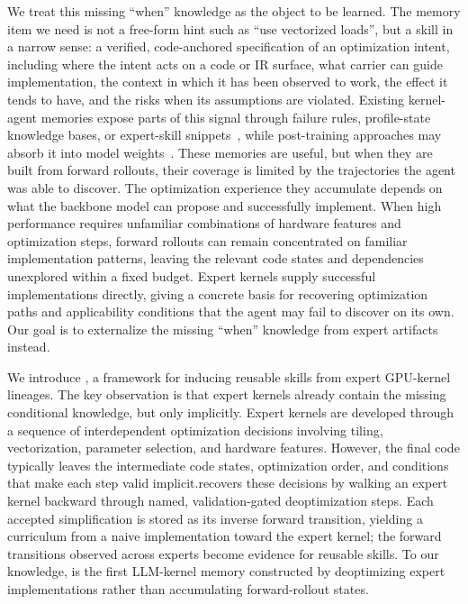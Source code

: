 We treat this missing ``when'' knowledge as the object to be learned. The memory item we need is not a free-form hint such as ``use vectorized loads'', but a skill in a narrow sense: a verified, code-anchored specification of an optimization intent, including where the intent acts on a code or IR surface, what carrier can guide implementation, the context in which it has been observed to work, the effect it tends to have, and the risks when its assumptions are violated. Existing kernel-agent memories expose parts of this signal through failure rules, profile-state knowledge bases, or expert-skill snippets~\citep{adaexplore,ksearch,kernelblaster,kernel_skill}, while post-training approaches may absorb it into model weights~\citep{kernel_smith,kevin_rl_kernel,cuda_l1}. 
These memories are useful, but when they are built from forward rollouts, their coverage is limited by the trajectories the agent was able to discover. The optimization experience they accumulate depends on what the backbone model can propose and successfully implement. When high performance requires unfamiliar combinations of hardware features and optimization steps, forward rollouts can remain concentrated on familiar implementation patterns, leaving the relevant code states and dependencies unexplored within a fixed budget. Expert kernels supply successful implementations directly, giving \sys a concrete basis for recovering optimization paths and applicability conditions that the agent may fail to discover on its own. Our goal is to externalize the missing ``when'' knowledge from expert artifacts instead.

We introduce \sys, a framework for inducing reusable skills from expert GPU-kernel lineages. The key observation is that expert kernels already contain the missing conditional knowledge, but only implicitly. 
Expert kernels are developed through a sequence of interdependent optimization decisions involving tiling, vectorization, parameter selection, and hardware features. However, the final code typically leaves the intermediate code states, optimization order, and conditions that make each step valid implicit.\sys recovers these decisions by walking an expert kernel backward through named, validation-gated deoptimization steps. Each accepted simplification is stored as its inverse forward transition, yielding a curriculum from a naive implementation toward the expert kernel; the forward transitions observed across experts become evidence for reusable skills. To our knowledge, \sys is the first LLM-kernel memory constructed by deoptimizing expert implementations rather than accumulating forward-rollout states.


